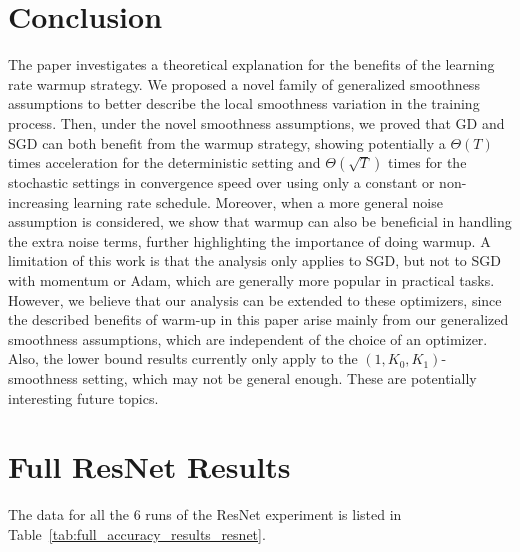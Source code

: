 \documentclass{article}
\begin{document}
\section{Conclusion}
The paper investigates a theoretical explanation for the benefits of the learning rate warmup strategy. We proposed a novel family of generalized smoothness assumptions to better describe the local smoothness variation in the training process. Then, under the novel smoothness assumptions, we proved that GD and SGD can both benefit from the warmup strategy, showing potentially a $\Theta(T)$ times acceleration for the deterministic setting and $\Theta(\sqrt{T})$ times for the stochastic settings in convergence speed over using only a constant or non-increasing learning rate schedule. Moreover, when a more general noise assumption is considered, we show that warmup can also be beneficial in handling the extra noise terms, further highlighting the importance of doing warmup.
A limitation of this work is that the analysis only applies to SGD, but not to SGD with momentum or Adam, which are generally more popular in practical tasks.
{However, we believe that our analysis can be extended to these optimizers, since the described benefits of warm-up in this paper arise mainly from our generalized smoothness assumptions, which are independent of the choice of an optimizer.}
Also, the lower bound results currently only apply to the $(1,K_0,K_1)$-smoothness setting, which may not be general enough. These are potentially interesting future topics.






\appendix

\allowdisplaybreaks[4]


\section{Full ResNet Results}

The data for all the $6$ runs of the ResNet experiment is listed in Table~\ref{tab:full_accuracy_results_resnet}.
\end{document}
